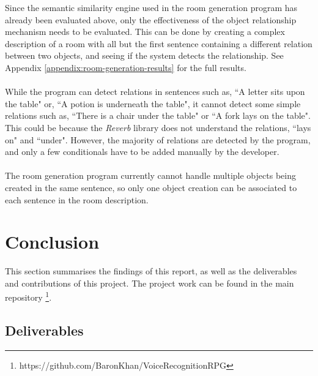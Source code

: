 \documentclass[11pt]{article}
\begin{document}
Since the semantic similarity engine used in the room generation program has already been evaluated above, only the effectiveness of the object relationship mechanism needs to be evaluated. This can be done by creating a complex description of a room with all but the first sentence containing a different relation between two objects, and seeing if the system detects the relationship. See Appendix \ref{appendix:room-generation-results} for the full results.
\\
\\
While the program can detect relations in sentences such as, ``A letter sits upon the table" or, ``A potion is underneath the table", it cannot detect some simple relations such as, ``There is a chair under the table" or ``A fork lays on the table". This could be because the \textit{Reverb} library does not understand the relations, ``lays on" and ``under". However, the majority of relations are detected by the program, and only a few conditionals have to be added manually by the developer.
\\
\\
The room generation program currently cannot handle multiple objects being created in the same sentence, so only one object creation can be associated to each sentence in the room description.



\newpage
\section{Conclusion}

This section summarises the findings of this report, as well as the deliverables and contributions of this project. The project work can be found in the main repository \footnote{https://github.com/BaronKhan/VoiceRecognitionRPG}.

\subsection{Deliverables}
\label{section:deliverables}
\end{document}
